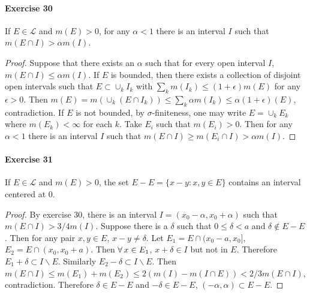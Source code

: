 \paragraph{Exercise 30}
If $E\in\mathcal{L}$ and $m(E)>0$, for any $\alpha<1$ there is an interval $I$ such that $m(E\cap I)>\alpha m(I)$.
\begin{proof}
    Suppose that there exists an $\alpha$ such that for every open interval $I$,  $m(E\cap I)\le\alpha m(I)$. If $E$ is bounded, then there exists a collection of disjoint open intervals such that $E\subset\cup_k I_k$ with $\sum_k m(I_k)\le(1+\epsilon)m(E)$ for any $\epsilon>0$. Then $m(E)=m(\cup_k (E\cap I_k))\le\sum_k\alpha m(I_k)\le\alpha(1+\epsilon)(E)$, contradiction. If $E$ is not bounded, by $\sigma$-finiteness, one may write $E=\cup_k E_k$ where $m(E_k)<\infty$ for each $k$. Take $E_i$ such that $m(E_i)>0$. Then for any $\alpha<1$ there is an interval $I$ such that $m(E\cap I)\ge m(E_i\cap I)>\alpha m(I)$. 
\end{proof}
\paragraph{Exercise 31}
If $E\in\mathcal{L}$ and $m(E)>0$, the set $E-E=\{x-y:x,y\in E\}$ contains an interval centered at $0$.
\begin{proof}
    By exercise 30, there is an interval $I=(x_0-\alpha,x_0+\alpha)$ such that $m(E\cap I)>3/4 m(I)$. Suppose there is a $\delta$ such that $0\le\delta<a$ and $\delta\not\in E-E$. Then for any pair $x,y\in E$, $x-y\neq\delta$. Let $E_1=E\cap(x_0-a,x_0]$, $E_2=E\cap(x_0,x_0+a)$. Then $\forall\, x\in E_1$, $x+\delta\in I$ but not in $E$. Therefore $E_1+\delta\subset I\backslash E$. Similarly $E_2-\delta\subset I\backslash E$. Then $m(E\cap I)\le m(E_1)+m(E_2)\le 2(m(I)-m(I\cap E))<2/3m(E\cap I)$, contradiction. Therefore $\delta\in E-E$ and $-\delta\in E-E$, $(-\alpha,\alpha)\subset E-E$.
\end{proof}

